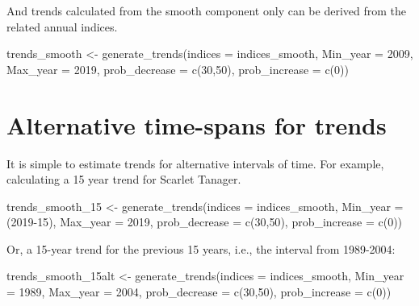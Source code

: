 \documentclass[
]{book}
\newenvironment{Shaded}{\begin{snugshade}}{\end{snugshade}}
\newcommand{\AttributeTok}[1]{\textcolor[rgb]{0.77,0.63,0.00}{#1}}
\newcommand{\DecValTok}[1]{\textcolor[rgb]{0.00,0.00,0.81}{#1}}
\newcommand{\FunctionTok}[1]{\textcolor[rgb]{0.00,0.00,0.00}{#1}}
\newcommand{\NormalTok}[1]{#1}
\newcommand{\OtherTok}[1]{\textcolor[rgb]{0.56,0.35,0.01}{#1}}
\begin{document}
And trends calculated from the smooth component only can be derived from the related annual indices.

\begin{Shaded}
\begin{Highlighting}[]
\NormalTok{trends\_smooth }\OtherTok{\textless{}{-}} \FunctionTok{generate\_trends}\NormalTok{(}\AttributeTok{indices =}\NormalTok{ indices\_smooth,}
                          \AttributeTok{Min\_year =} \DecValTok{2009}\NormalTok{,}
                          \AttributeTok{Max\_year =} \DecValTok{2019}\NormalTok{,}
                          \AttributeTok{prob\_decrease =} \FunctionTok{c}\NormalTok{(}\DecValTok{30}\NormalTok{,}\DecValTok{50}\NormalTok{),}
                          \AttributeTok{prob\_increase =} \FunctionTok{c}\NormalTok{(}\DecValTok{0}\NormalTok{))}
\end{Highlighting}
\end{Shaded}

\hypertarget{alternative-time-spans-for-trends}{%
\section{Alternative time-spans for trends}\label{alternative-time-spans-for-trends}}

It is simple to estimate trends for alternative intervals of time. For example, calculating a 15 year trend for Scarlet Tanager.

\begin{Shaded}
\begin{Highlighting}[]
\NormalTok{trends\_smooth\_15 }\OtherTok{\textless{}{-}} \FunctionTok{generate\_trends}\NormalTok{(}\AttributeTok{indices =}\NormalTok{ indices\_smooth,}
                          \AttributeTok{Min\_year =}\NormalTok{ (}\DecValTok{2019{-}15}\NormalTok{),}
                          \AttributeTok{Max\_year =} \DecValTok{2019}\NormalTok{,}
                          \AttributeTok{prob\_decrease =} \FunctionTok{c}\NormalTok{(}\DecValTok{30}\NormalTok{,}\DecValTok{50}\NormalTok{),}
                          \AttributeTok{prob\_increase =} \FunctionTok{c}\NormalTok{(}\DecValTok{0}\NormalTok{)) }
\end{Highlighting}
\end{Shaded}

Or, a 15-year trend for the previous 15 years, i.e., the interval from 1989-2004:

\begin{Shaded}
\begin{Highlighting}[]
\NormalTok{trends\_smooth\_15alt }\OtherTok{\textless{}{-}} \FunctionTok{generate\_trends}\NormalTok{(}\AttributeTok{indices =}\NormalTok{ indices\_smooth,}
                          \AttributeTok{Min\_year =} \DecValTok{1989}\NormalTok{,}
                          \AttributeTok{Max\_year =} \DecValTok{2004}\NormalTok{,}
                          \AttributeTok{prob\_decrease =} \FunctionTok{c}\NormalTok{(}\DecValTok{30}\NormalTok{,}\DecValTok{50}\NormalTok{),}
                          \AttributeTok{prob\_increase =} \FunctionTok{c}\NormalTok{(}\DecValTok{0}\NormalTok{))}
\end{Highlighting}
\end{Shaded}
\end{document}
